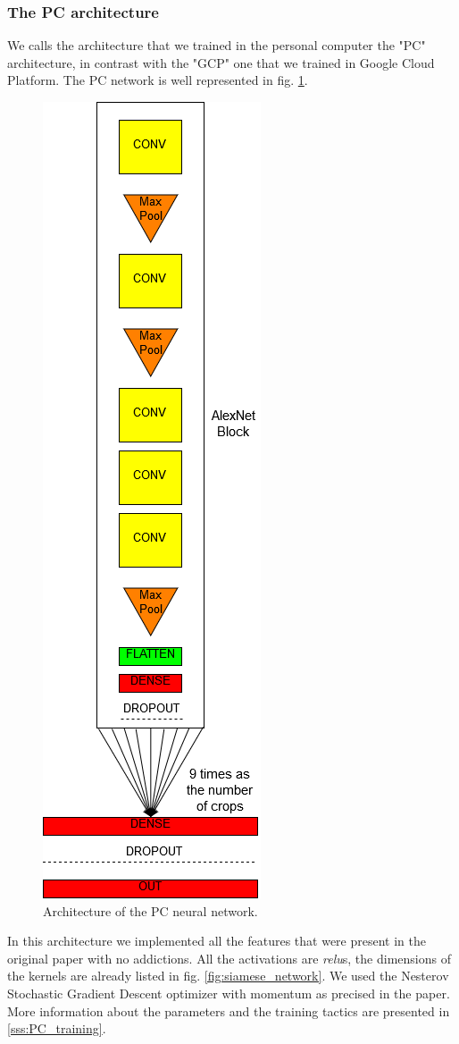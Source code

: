 \subsubsection{The PC architecture}\label{sss:PC_arch}
We calls the architecture that we trained in the personal computer the "PC" architecture, in contrast with the "GCP" one that we trained in Google Cloud Platform.\newline
The PC network is well represented in fig. \ref{fig:PC_net}.
\begin{figure}[!ht]
    \centering
    \includegraphics[scale=0.45]{images/PC_net.png}
    \caption{Architecture of the PC neural network.}
    \label{fig:PC_net}
\end{figure}
In this architecture we implemented all the features that were present in the original paper \cite{Noroozi_2016} with no addictions. All the activations are \emph{relu}s, the dimensions of the kernels are already listed in fig. \ref{fig:siamese_network}. We used the Nesterov Stochastic Gradient Descent optimizer with momentum as precised in the paper. More information about the parameters and the training tactics are presented in \ref{sss:PC_training}.

